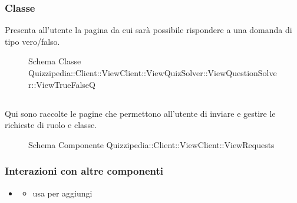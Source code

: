 \subsubsection{Classe }
Presenta all'utente la pagina da cui sarà possibile rispondere a una domanda di tipo vero/falso.
\begin{figure}[H]
\centering
\noindent{}
\caption[Schema Classe ViewTrueFalseQ]{Schema Classe Quizzipedia::Client::ViewClient::ViewQuizSolver::ViewQuestionSolver::ViewTrueFalseQ}
\end{figure}
\subsection{}
Qui sono raccolte le pagine che permettono all'utente di inviare e gestire le richieste di ruolo e classe.
\begin{figure}[H]
\centering
\noindent{}
\caption[Schema Componente Quizzipedia::Client::ViewClient::ViewRequests]{Schema Componente Quizzipedia::Client::ViewClient::ViewRequests}
\end{figure}
\subsubsection{Interazioni con altre componenti}
\begin{itemize}
\item {}
\begin{itemize}
\item usa  per aggiungi
\end{itemize}
\end{itemize}
